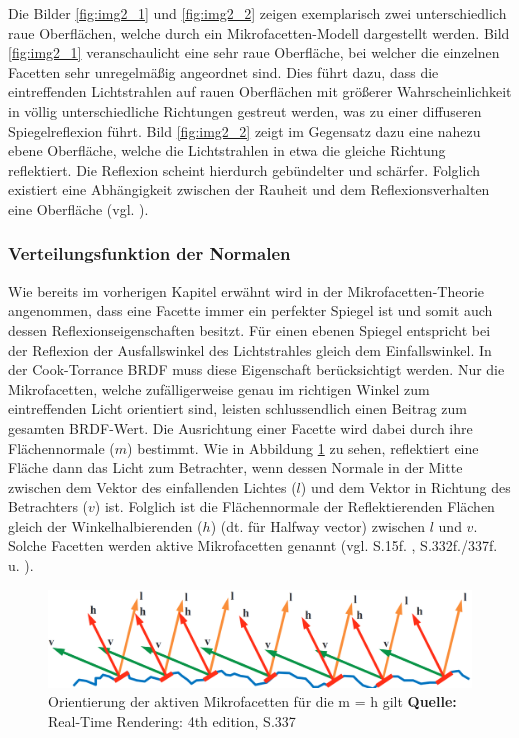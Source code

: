 \documentclass[
  11pt,
  a4paper,
  oneside
  ]{article}
\begin{document}
Die Bilder \ref{fig:img2_1} und \ref{fig:img2_2} zeigen exemplarisch zwei unterschiedlich raue Oberflächen, welche durch ein Mikrofacetten-Modell dargestellt werden. Bild \ref{fig:img2_1} veranschaulicht eine sehr raue Oberfläche, bei welcher die einzelnen Facetten sehr unregelmäßig angeordnet sind. Dies führt dazu, dass die eintreffenden Lichtstrahlen auf rauen Oberflächen mit größerer Wahrscheinlichkeit in völlig unterschiedliche Richtungen gestreut werden, was zu einer diffuseren Spiegelreflexion führt. Bild \ref{fig:img2_2} zeigt im Gegensatz dazu eine nahezu ebene Oberfläche, welche die Lichtstrahlen in etwa die gleiche Richtung reflektiert. Die Reflexion scheint hierdurch gebündelter und schärfer. Folglich existiert eine Abhängigkeit zwischen der Rauheit und dem Reflexionsverhalten eine Oberfläche 
(vgl. \cite{learnOpenGL}). 

\subsubsection{Verteilungsfunktion der Normalen}\label{sec:ndf}
Wie bereits im vorherigen Kapitel erwähnt wird in der Mikrofacetten-Theorie angenommen, dass eine Facette immer ein perfekter Spiegel ist und somit auch dessen Reflexionseigenschaften besitzt. Für einen ebenen Spiegel entspricht bei der Reflexion der Ausfallswinkel des Lichtstrahles gleich dem Einfallswinkel. In der Cook-Torrance BRDF muss diese Eigenschaft berücksichtigt werden. Nur die Mikrofacetten, welche zufälligerweise genau im richtigen Winkel zum eintreffenden Licht orientiert sind, leisten schlussendlich einen Beitrag zum gesamten BRDF-Wert. Die Ausrichtung einer Facette wird dabei durch ihre Flächennormale ($m$) bestimmt. Wie in Abbildung \ref{fig:img7} zu sehen, reflektiert eine Fläche dann das Licht zum Betrachter, wenn dessen Normale in der Mitte zwischen dem Vektor des einfallenden Lichtes ($l$) und dem Vektor in Richtung des Betrachters ($v$) ist. Folglich ist die Flächennormale der Reflektierenden Flächen gleich der Winkelhalbierenden ($h$) (dt. für Halfway vector) zwischen $l$ und $v$. Solche Facetten werden aktive Mikrofacetten genannt
(vgl. S.15f. \cite{rtrPaper}, S.332f./337f. \cite{realTimeRendering4th} u. \cite{learnOpenGL}).
\begin{figure}[H]
  \centering
  \includegraphics*[width=0.9 \textwidth]{images/normalDistriFun.png}
  \caption{Orientierung der aktiven Mikrofacetten für die m = h gilt \footnotesize\textbf{Quelle:} Real-Time Rendering: 4th edition, S.337 \cite{realTimeRendering4th}}
  \label{fig:img7}
\end{figure}
\end{document}
